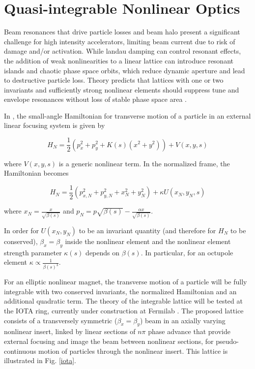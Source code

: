 
\renewcommand{\thechapter}{2}


\section{Quasi-integrable Nonlinear Optics}

Beam resonances that drive particle losses and beam halo present a significant challenge for high intensity accelerators, limiting beam current due to risk of damage and/or activation. While landau damping can control resonant effects, the addition of weak nonlinearities to a linear lattice can introduce resonant islands and chaotic phase space orbits, which reduce dynamic aperture and lead to destructive particle loss. Theory predicts that lattices with one or two invariants and sufficiently strong nonlinear elements should suppress tune and envelope resonances without loss of stable phase space area \cite{DN}. 

In \cite{DN}, the small-angle Hamiltonian for transverse motion of a particle in an external linear focusing system is given by 

\begin{equation}
H_N = \frac{1}{2} \left( p_{x}^2 + p_{y}^2 + K(s) \left(x^2 + y^2 \right) \right) + V(x,y,s)
\end{equation}

where $V(x,y,s)$ is a generic nonlinear term. In the normalized frame, the Hamiltonian becomes 

\begin{equation}
H_N = \frac{1}{2} \left( p_{x,N}^2 + p_{y,N}^2 +x_N^2 + y_N^2 \right) + \kappa U(x_N,y_N,s)
\end{equation}

where $x_N = \frac{x}{\sqrt{\beta(s)}}$ and $p_N = p\sqrt{\beta(s)}-\frac{\alpha x}{\sqrt{\beta(s)}}$. 

In order for $U(x_N,y_N)$ to be an invariant quantity (and therefore for $H_N$ to be conserved), $\beta_x=\beta_y$ inside the nonlinear element and the nonlinear element strength parameter $\kappa (s)$ depends on $\beta (s)$. In particular, for an octupole element $\kappa \propto \frac{1}{\beta(s)^3}$.

For an elliptic nonlinear magnet, the transverse motion of a particle will be fully integrable with two conserved invariants, the normalized Hamiltonian and an additional quadratic term. The theory of the integrable lattice will be tested at the IOTA ring, currently under construction at Fermilab \cite{ipac12,antipov}. The proposed lattice consists of a transversely symmetric ($\beta_x = \beta_y$) beam in an axially varying nonlinear insert, linked by linear sections of $n\pi$ phase advance that provide external focusing and image the beam between nonlinear sections, for pseudo-continuous motion of particles through the nonlinear insert. This lattice is illustrated in Fig. \ref{iota}.

